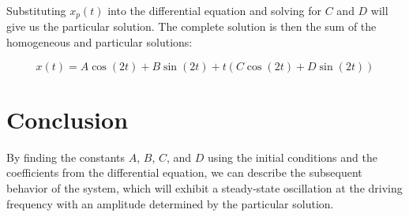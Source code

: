 \documentclass{article}
\begin{document}
Substituting \( x_p(t) \) into the differential equation and solving for \( C \) and \( D \) will give us the particular solution. The complete solution is then the sum of the homogeneous and particular solutions:

\[ x(t) = A\cos(2t) + B\sin(2t) + t(C\cos(2t) + D\sin(2t)) \]

\section*{Conclusion}
By finding the constants \( A \), \( B \), \( C \), and \( D \) using the initial conditions and the coefficients from the differential equation, we can describe the subsequent behavior of the system, which will exhibit a steady-state oscillation at the driving frequency with an amplitude determined by the particular solution.
\end{document}
